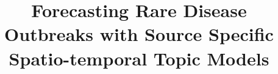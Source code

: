 \documentclass{sig-alternate}
\begin{document}

\title{Forecasting Rare Disease Outbreaks with Source Specific Spatio-temporal Topic Models}

\end{document}
